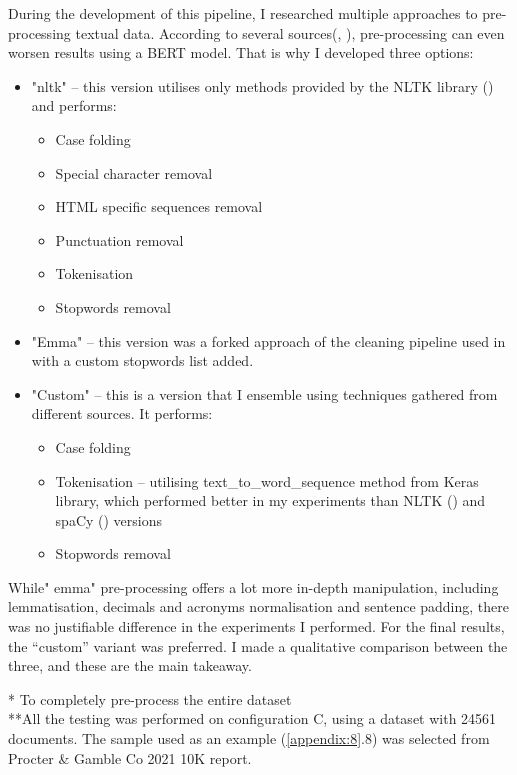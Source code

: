 \documentclass[12pt,MSc,a4paper,oneside]{muthesis}
\begin{document}
During the development of this pipeline, I researched multiple approaches to pre-processing textual data. According to several sources(\cite{DBLP:journals/corr/abs-2109-13890}, \cite{bert-clear-data}), pre-processing can even worsen results using a BERT model. That is why I developed three options:
\begin{itemize}
  \item   "nltk" – this version utilises only methods provided by the NLTK library (\cite{nltk})  and performs:
    \begin{itemize}
      \item Case folding
      \item Special character removal
      \item HTML specific sequences removal
      \item Punctuation removal
      \item Tokenisation
      \item Stopwords removal
    \end{itemize}
  \item "Emma" – this version was a forked approach of the cleaning pipeline used in \cite{Tattershall2019DetectingBT} with a custom stopwords list added.
  \item "Custom" – this is a version that I ensemble using techniques gathered from different sources. It performs:
    \begin{itemize}
      \item Case folding
      \item Tokenisation – utilising text\_to\_word\_sequence \cite{text-tokenizer-keras} method from Keras \cite{chollet2015keras} library, which performed better in my experiments than NLTK (\cite{nltk}) and spaCy (\cite{spacy2}) versions
      \item Stopwords removal
    \end{itemize}
\end{itemize}

While" emma" pre-processing offers a lot more in-depth manipulation, including lemmatisation, decimals and acronyms normalisation and sentence padding, there was no justifiable difference in the experiments I performed. For the final results, the “custom” variant was preferred.
I made a qualitative comparison between the three, and these are the main takeaway.

* To completely pre-process the entire dataset \\
**All the testing was performed on configuration C, using a dataset with 24561 documents. The sample used as an example (\ref{appendix:8}.8) was selected from Procter & Gamble Co 2021 10K report. \\
\end{document}
